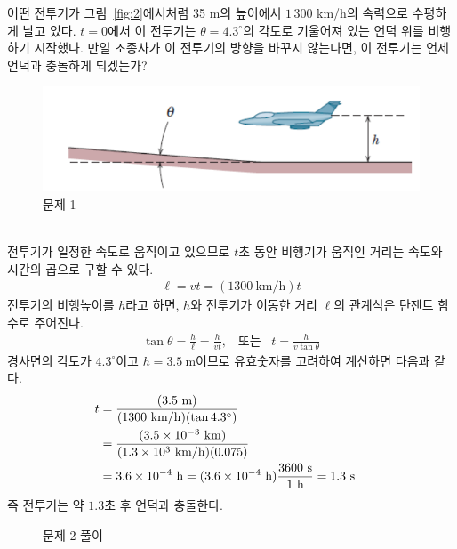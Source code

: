\documentclass[APS,floatfix,nofootinbib,superscriptaddress,fleqn,preprint]{revtex4}
\begin{document}
어떤 전투기가 그림~\ref{fig:2}에서처럼
35 m의 높이에서 $1\,300$ km/h의 속력으로 수평하게 날고 있다. $t=0$에서
이 전투기는 $\theta=4.3^\circ$의 각도로 기울어져 있는 언덕 위를
비행하기 시작했다. 만일 조종사가 이 전투기의 방향을 바꾸지 않는다면,
이 전투기는 언제 언덕과 충돌하게 되겠는가? 
\begin{figure}[ht]
  \centering
\includegraphics[scale=1.0]{Qfig3-2.pdf}  
  \caption{문제 1}
  \label{fig:1}
\end{figure} \\
전투기가 일정한 속도로 움직이고 있으므로 $t$초 동안 비행기가 움직인 거리는 속도와 시간의
곱으로 구할 수 있다.
\begin{align} \label{}
\ell = vt = (1300~\mathrm{km/h})t
\end{align}
전투기의 비행높이를 $h$라고 하면, $h$와 전투기가 이동한 거리 $\ell$의 관계식은 탄젠트 함수로 주어진다.
\begin{align} \label{}
\tan{\theta} = \frac{h}{\ell} = \frac{h}{vt}, \;\;\; \text{또는} \;\;\; t = 
\frac{h}{v\tan{\theta}}
\end{align}
경사면의 각도가 $4.3^\circ$이고 $h=3.5~\mathrm{m}$이므로 유효숫자를 고려하여 계산하면 다음과 같다.
\begin{align} \label{}
t &= \frac{(3.5~\mathrm{m})}{(1300~\mathrm{km/h})(\tan{4.3^\circ})} \cr
&= \frac{(3.5\times 10^{-3}~\mathrm{km})}{(1.3\times 10^3~\mathrm{km/h})(0.075)}
\cr
&= 3.6\times 10^{-4}~\mathrm{h} = (3.6\times 10^{-4}~\mathrm{h})
\frac{3600~\mathrm{s}}{1~\mathrm{h}} = 1.3~\mathrm{s}
\end{align}
즉 전투기는 약 $1.3$초 후 언덕과 충돌한다.
\begin{figure}[htp]
\centering
\caption{문제 2 풀이}
\end{figure}
\vspace{0.5cm}
\end{document}
